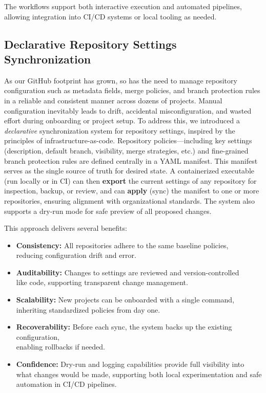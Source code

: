 \documentclass{article}
\begin{document}
The workflows support both interactive execution and automated pipelines,
allowing integration into CI/CD systems or local tooling as needed.

\subsection{Declarative Repository Settings Synchronization}

As our GitHub footprint has grown, so has the need to manage repository
configuration such as metadata fields, merge policies, and branch protection
rules in a reliable and consistent manner across dozens of projects.
Manual configuration inevitably leads to drift, accidental misconfiguration,
and wasted effort during onboarding or project setup. To address this, we
introduced a \textit{declarative} synchronization system for repository
settings, inspired by the principles of infrastructure-as-code. Repository
policies—including key settings (description, default branch, visibility,
merge strategies, etc.) and fine-grained branch protection rules are defined
centrally in a YAML manifest. This manifest serves as the single source of
truth for desired state. A containerized executable (run locally or in CI) can
then \textbf{export} the current settings of any repository for inspection,
backup, or review, and can \textbf{apply} (sync) the manifest to one or more
repositories, ensuring alignment with organizational standards. The system also
supports a dry-run mode for safe preview of all proposed changes.

This approach delivers several benefits:
\begin{itemize}
    \item \textbf{Consistency:} All repositories adhere to the same baseline policies,\\
    reducing configuration drift and error.
    \item \textbf{Auditability:} Changes to settings are reviewed and version-controlled\\
    like code, supporting transparent change management.
    \item \textbf{Scalability:} New projects can be onboarded with a single command,\\
    inheriting standardized policies from day one.
    \item \textbf{Recoverability:} Before each sync, the system backs up the existing configuration,\\
    enabling rollbacks if needed.
    \item \textbf{Confidence:} Dry-run and logging capabilities provide full visibility into\\
    what changes would be made, supporting both local experimentation and safe automation in CI/CD pipelines.
\end{itemize}
\end{document}
